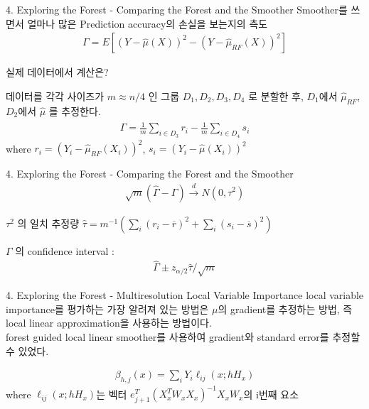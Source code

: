 \documentclass[mathserif]{beamer}
\begin{document}
\begin{frame}{4. Exploring the Forest - Comparing the Forest and the Smoother}
Smoother를 쓰면서 얼마나 많은 Prediction accuracy의 손실을 보는지의 측도\\
\begin{align*}
    \Gamma = E[(Y-\hat{\mu}(X))^2-(Y-\hat{\mu}_{RF}(X))^2]
\end{align*}

실제 데이터에서 계산은?\\

\vspace{3mm}

데이터를 각각 사이즈가 $m \approx n/4$ 인 그룹 $D_1,D_2,D_3,D_4$ 로 분할한 후, $D_1$에서 $\hat{\mu}_{RF}$, $D_2$에서 $\hat{\mu}$ 를 추정한다. \\
\begin{align*}
    \hat{\Gamma} = \frac{1}{m}\sum_{i\in D_3}r_i - \frac{1}{m}\sum_{i \in D_4}s_i
\end{align*}
where $r_i = (Y_i - \hat{\mu}_{RF}(X_i))^2$, $s_i = (Y_i - \hat{\mu}(X_i))^2$


\end{frame}

\begin{frame}{4. Exploring the Forest - Comparing the Forest and the Smoother}
\begin{align*}
    \sqrt{m}(\hat{\Gamma} - \Gamma) \overset{d}{\to} N(0,\tau^2)
\end{align*}

$\tau^2$ 의 일치 추정량 $\hat{\tau} = m^{-1}(\sum_i(r_i-\overline{r})^2+\sum_i(s_i-\overline{s})^2)$\\

\vspace{3mm}

$\Gamma$ 의  confidence interval :
\begin{align*}
    \hat{\Gamma} \pm z_{\alpha/2}\hat{\tau}/\sqrt{m}
\end{align*}
\end{frame}


\begin{frame}{4. Exploring the Forest - Multiresolution Local Variable Importance}
local variable importance를 평가하는 가장 알려져 있는 방법은 $\mu$의 gradient를 추정하는 방법, 즉 local linear approximation을 사용하는 방법이다.\\
forest guided local linear smoother를 사용하여 gradient와 standard error를 추정할 수 있었다.

\begin{align*}
    \beta_{h,j}(x) = \sum_iY_i\ell_{ij}(x;hH_x)
\end{align*}
where $\ell_{ij}(x;hH_x)$는 벡터 $e_{j+1}^T(X_x^TW_xX_x)^{-1}X_xW_x$의 i번째 요소

\end{frame}
\end{document}
